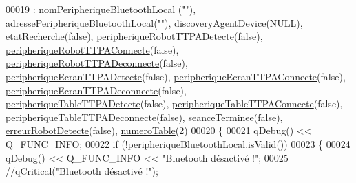 \begin{DoxyCode}
00019                                                : \hyperlink{class_communication_bluetooth_a6781eed73c4b5db0fe7ff94c034f2cf5}{nomPeripheriqueBluetoothLocal}
      (\textcolor{stringliteral}{""}), \hyperlink{class_communication_bluetooth_a972265a71842606740b53560a7fc0e53}{adressePeripheriqueBluetoothLocal}(\textcolor{stringliteral}{""}), 
      \hyperlink{class_communication_bluetooth_a9e04dbd88ba090525d6691cc1a4237b6}{discoveryAgentDevice}(NULL), \hyperlink{class_communication_bluetooth_a9e252653d4d3c6fa9c772b35bf0eb02f}{etatRecherche}(\textcolor{keyword}{false}), 
      \hyperlink{class_communication_bluetooth_ac4bf43e3da4748c8fa25e0ac1d3cf849}{peripheriqueRobotTTPADetecte}(\textcolor{keyword}{false}),
      \hyperlink{class_communication_bluetooth_a451b47553dd5cf716e8825c0fc0c203b}{peripheriqueRobotTTPAConnecte}(\textcolor{keyword}{false}),
      \hyperlink{class_communication_bluetooth_aaebda45ba1821d9b15ed957926954ddc}{peripheriqueRobotTTPADeconnecte}(\textcolor{keyword}{false}),
      \hyperlink{class_communication_bluetooth_a2027c09adf569761c9a0500ab00f14fa}{peripheriqueEcranTTPADetecte}(\textcolor{keyword}{false}),
      \hyperlink{class_communication_bluetooth_ace9f69a994a3e9bbaab18ef48ff0f6a3}{peripheriqueEcranTTPAConnecte}(\textcolor{keyword}{false}),
      \hyperlink{class_communication_bluetooth_ac08fb857ef766c65aa87a4f3788f4592}{peripheriqueEcranTTPADeconnecte}(\textcolor{keyword}{false}),
      \hyperlink{class_communication_bluetooth_a1b4f8cfa7d15ede41c4a6f5c9521e955}{peripheriqueTableTTPADetecte}(\textcolor{keyword}{false}),
      \hyperlink{class_communication_bluetooth_a3b2e75b95ad66dd46d6b1268694c74dc}{peripheriqueTableTTPAConnecte}(\textcolor{keyword}{false}),
      \hyperlink{class_communication_bluetooth_af19f121ae4dcfe52d4c06893e88cec80}{peripheriqueTableTTPADeconnecte}(\textcolor{keyword}{false}),
      \hyperlink{class_communication_bluetooth_a80ddad176c95b72e083c32b39b4454cc}{seanceTerminee}(\textcolor{keyword}{false}), \hyperlink{class_communication_bluetooth_a0ceb51c44da6c7479b46ae8e737e1541}{erreurRobotDetecte}(\textcolor{keyword}{false}),
      \hyperlink{class_communication_bluetooth_a9428f8261f0cc055e9c6fed9a61cb595}{numeroTable}(2)
00020 \{
00021     qDebug() << Q\_FUNC\_INFO;
00022     \textcolor{keywordflow}{if} (!\hyperlink{class_communication_bluetooth_a03c857db65a9ea5a0b944844f675e6fa}{peripheriqueBluetoothLocal}.isValid())
00023     \{
00024         qDebug() << Q\_FUNC\_INFO << \textcolor{stringliteral}{"Bluetooth désactivé !"};
00025         \textcolor{comment}{//qCritical("Bluetooth désactivé !");}

\end{DoxyCode}
